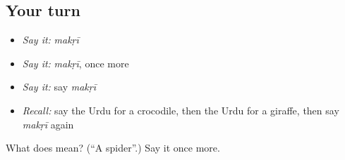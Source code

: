 \subsection*{Your turn}
\begin{itemize}
\raggedright
  \item \emph{Say it:} \emph{makṛī}
  \item \emph{Say it:} \emph{makṛī}, once more
  \item \emph{Say it:} say \emph{makṛī}
  \item \emph{Recall:} say the Urdu for a crocodile, then the Urdu for a giraffe, then say \emph{makṛī} again
\end{itemize}

\begin{tcolorbox}[breakable,colback=teal!4,colframe=teal!35!black,title={Before you move on}]
What does  mean? (\textquotedblleft{}A spider\textquotedblright{}.) Say it once more.
\end{tcolorbox}
